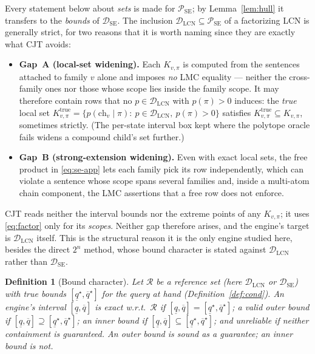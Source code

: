 \documentclass{article} %
\newtheorem{definition}{Definition}
\newcommand{\lo}{\underline}
\newcommand{\hi}{\overline}
\newcommand{\DSE}{\mathcal{D}_{\mathrm{SE}}}
\newcommand{\DLCN}{\mathcal{D}_{\mathrm{LCN}}}
\newcommand{\ch}{\mathrm{ch}}
\begin{document}
Every statement below about \emph{sets} is made for $\mathcal P_{\mathrm{SE}}$;
by Lemma~\ref{lem:hull} it transfers to the \emph{bounds} of $\DSE$. The
inclusion $\DLCN\subseteq\mathcal P_{\mathrm{SE}}$ of a factorizing LCN is
generally strict, for two reasons that it is worth naming since they are
exactly what \textsc{CJT} avoids:
\begin{itemize}
  \item \textbf{Gap~A (local-set widening).} Each $K_{v,\pi}$ is computed from the
    sentences attached to family $v$ alone and imposes \emph{no} LMC equality ---
    neither the cross-family ones nor those whose scope lies inside the family
    scope. It may therefore contain rows that no $p\in\DLCN$ with $p(\pi)>0$
    induces: the \emph{true} local set
    $K^{\mathrm{true}}_{v,\pi}=\{p(\ch_v\mid\pi):\ p\in\DLCN,\ p(\pi)>0\}$
    satisfies $K^{\mathrm{true}}_{v,\pi}\subseteq K_{v,\pi}$, sometimes strictly.
    (The per-state interval box kept where the polytope oracle fails widens a
    compound child's set further.)
  \item \textbf{Gap~B (strong-extension widening).} Even with exact local sets,
    the free product in \eqref{eq:se-app} lets each family pick its row
    independently, which can violate a sentence whose scope spans several
    families and, inside a multi-atom chain component, the LMC assertions that a
    free row does not enforce.
\end{itemize}
\textsc{CJT} reads neither the interval bounds nor the extreme points of any
$K_{v,\pi}$; it uses \eqref{eq:factor} only for its \emph{scopes}. Neither gap
therefore arises, and the engine's target is $\DLCN$ itself. This is the
structural reason it is the only engine studied here, besides the direct $2^n$
method, whose bound character is stated against $\DLCN$ rather than $\DSE$.

\begin{definition}[Bound character]\label{def:char}
Let $\mathcal R$ be a reference set (here $\DLCN$ or $\DSE$) with true bounds
$[\lo q^\star,\hi q^\star]$ for the query at hand (Definition~\ref{def:cond}). An
engine's interval $[\lo q,\hi q]$ is \emph{exact w.r.t.\ $\mathcal R$} if
$[\lo q,\hi q]=[\lo q^\star,\hi q^\star]$; a valid \emph{outer} bound if
$[\lo q,\hi q]\supseteq[\lo q^\star,\hi q^\star]$; an \emph{inner} bound if
$[\lo q,\hi q]\subseteq[\lo q^\star,\hi q^\star]$; and \emph{unreliable} if
neither containment is guaranteed. An outer bound is sound as a guarantee; an
inner bound is not.
\end{definition}
\end{document}
